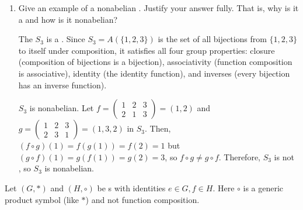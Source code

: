 \begin{enumerate}
\begin{subprove}
\begin{enumerate}
    \end{enumerate}
  \end{subprove}
  \item Give an example of a nonabelian .
  Justify your answer fully.
  That is, why is it a  and how is it nonabelian?
  \begin{subprove}
    The  \(S_{3}\) is a . Since \(S_{3} = A(\{1, 2, 3\})\) is the set of all bijections from \(\{1, 2, 3\}\) to itself under composition, it satisfies all four group properties: closure (composition of bijections is a bijection), associativity (function composition is associative), identity (the identity function), and inverses (every bijection has an inverse function).
    
    \(S_{3}\) is nonabelian. 
    Let \(f = \begin{pmatrix} 1 & 2 & 3 \\ 2 & 1 & 3 \end{pmatrix}=(1,2)\) 
    and \(g = \begin{pmatrix} 1 & 2 & 3 \\ 2 & 3 & 1 \end{pmatrix}=(1,3,2)\) in \(S_{3}\). 
    Then, \((f \circ g)(1) = f(g(1)) = f(2) = 1\) 
    but \((g \circ f)(1) = g(f(1)) = g(2) = 3\), 
    so \(f \circ g \neq g \circ f\). \proofstep
    Therefore, \(S_{3}\) is not , so \(S_{3}\) is nonabelian.
  \end{subprove}
\end{enumerate}




\newpage
Let \((G, *)\) and \((H, \circ)\) be s with identities \(e \in G, f \in H\).
Here \(\circ\) is a generic product symbol (like \(*\)) and not function composition.

